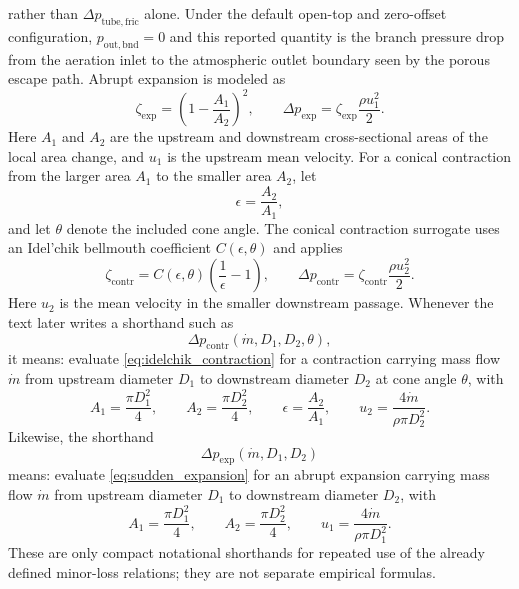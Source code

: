 \documentclass[11pt]{article}
\begin{document}
rather than \(\Delta p_{\mathrm{tube,fric}}\) alone. Under the default open-top and zero-offset configuration, \(p_{\mathrm{out,bnd}}=0\) and this reported quantity is the branch pressure drop from the aeration inlet to the atmospheric outlet boundary seen by the porous escape path.
Abrupt expansion is modeled as
\begin{equation}
\label{eq:sudden_expansion}
\zeta_{\mathrm{exp}}=\left(1-\frac{A_1}{A_2}\right)^2,
\qquad
\Delta p_{\mathrm{exp}}=\zeta_{\mathrm{exp}}\frac{\rho u_1^2}{2}.
\end{equation}
Here \(A_1\) and \(A_2\) are the upstream and downstream cross-sectional areas of the local area change, and \(u_1\) is the upstream mean velocity. For a conical contraction from the larger area \(A_1\) to the smaller area \(A_2\), let
\[
\epsilon=\frac{A_2}{A_1},
\]
and let \(\theta\) denote the included cone angle. The conical contraction surrogate uses an Idel'chik bellmouth coefficient \(C(\epsilon,\theta)\) and applies
\begin{equation}
\label{eq:idelchik_contraction}
\zeta_{\mathrm{contr}}=C(\epsilon,\theta)\left(\frac{1}{\epsilon}-1\right),
\qquad
\Delta p_{\mathrm{contr}}=\zeta_{\mathrm{contr}}\frac{\rho u_2^2}{2}.
\end{equation}
Here \(u_2\) is the mean velocity in the smaller downstream passage. Whenever the text later writes a shorthand such as
\[
\Delta p_{\mathrm{contr}}(\dot m,D_1,D_2,\theta),
\]
it means: evaluate \eqref{eq:idelchik_contraction} for a contraction carrying mass flow \(\dot m\) from upstream diameter \(D_1\) to downstream diameter \(D_2\) at cone angle \(\theta\), with
\[
A_1=\frac{\pi D_1^2}{4},
\qquad
A_2=\frac{\pi D_2^2}{4},
\qquad
\epsilon=\frac{A_2}{A_1},
\qquad
u_2=\frac{4\dot m}{\rho\pi D_2^2}.
\]
Likewise, the shorthand
\[
\Delta p_{\mathrm{exp}}(\dot m,D_1,D_2)
\]
means: evaluate \eqref{eq:sudden_expansion} for an abrupt expansion carrying mass flow \(\dot m\) from upstream diameter \(D_1\) to downstream diameter \(D_2\), with
\[
A_1=\frac{\pi D_1^2}{4},
\qquad
A_2=\frac{\pi D_2^2}{4},
\qquad
u_1=\frac{4\dot m}{\rho\pi D_1^2}.
\]
These are only compact notational shorthands for repeated use of the already defined minor-loss relations; they are not separate empirical formulas.
\end{document}
